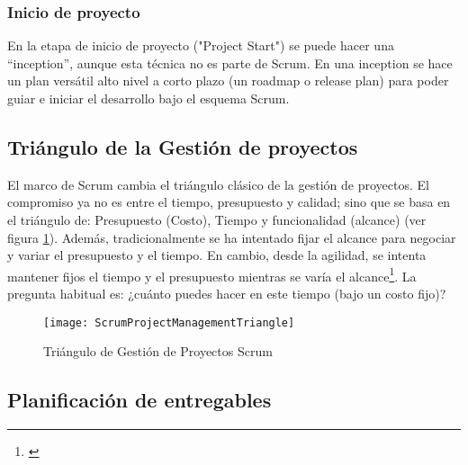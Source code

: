 \subsubsection{Inicio de proyecto}

En la etapa de inicio de proyecto ("Project Start") se puede hacer una “inception”, aunque esta técnica no es parte de Scrum. En una inception se hace un plan versátil alto nivel a corto plazo (un roadmap o release plan) para poder guiar e iniciar el desarrollo bajo el esquema Scrum.

\subsection{Triángulo de la Gestión de proyectos}

El marco de Scrum cambia el triángulo clásico de la gestión de proyectos. El compromiso ya no es entre el tiempo, presupuesto y calidad; sino que se basa en el triángulo de: Presupuesto (Costo), Tiempo y funcionalidad (alcance) (ver figura \ref{fig:ScrumProjectManagementTriangle}). Además, tradicionalmente se ha intentado fijar el alcance para negociar y variar el presupuesto y el tiempo. En cambio, desde la agilidad, se intenta mantener fijos el tiempo y el presupuesto mientras se varía el alcance\footnote{\cite{Martin-Alaimo-2014}}. La pregunta habitual es: ¿cuánto puedes hacer en este tiempo (bajo un costo fijo)?

\begin{figure}[h]
  \centering
  \texttt{[image: ScrumProjectManagementTriangle]}
  \caption{Triángulo de Gestión de Proyectos Scrum}
  \centering
  \label{fig:ScrumProjectManagementTriangle} %
\end{figure}

\subsection{Planificación de entregables}


